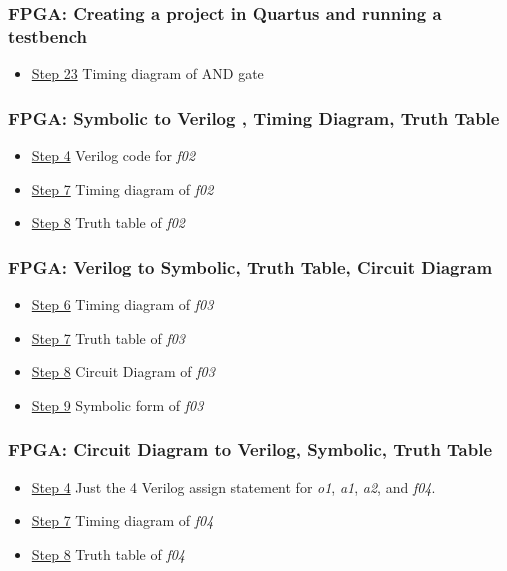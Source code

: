 \subsubsection{FPGA: Creating a project in Quartus and running a testbench}
\begin{itemize}
	\item \protect\hyperlink{Part_1_Step_23}{Step 23} Timing diagram of AND gate
\end{itemize}

\subsubsection{FPGA: Symbolic to Verilog , Timing Diagram, Truth Table}
\begin{itemize}
	\item \protect\hyperlink{Part_2_Step_4}{Step 4} Verilog code for \emph{f02}
	\item \protect\hyperlink{Part_2_Step_7}{Step 7} Timing diagram of \emph{f02}
	\item \protect\hyperlink{Part_2_Step_8}{Step 8} Truth table of \emph{f02}
\end{itemize}

\subsubsection{FPGA: Verilog to Symbolic, Truth Table, Circuit Diagram}
\begin{itemize}
	\item \protect\hyperlink{Part_3_Step_6}{Step 6} Timing diagram of \emph{f03}
	\item \protect\hyperlink{Part_3_Step_7}{Step 7} Truth table of \emph{f03}
	\item \protect\hyperlink{Part_3_Step_8}{Step 8} Circuit	Diagram of \emph{f03}
	\item \protect\hyperlink{Part_3_Step_9}{Step 9} Symbolic form of \emph{f03}
\end{itemize}

\subsubsection{FPGA: Circuit Diagram to Verilog, Symbolic, Truth Table}
\begin{itemize}
	\item \protect\hyperlink{Part_4_Step_4}{Step 4} Just the 4 Verilog assign statement 
			for \emph{o1}, \emph{a1}, \emph{a2}, and \emph{f04}.
	\item \protect\hyperlink{Part_4_Step_7}{Step 7} Timing diagram of \emph{f04}
	\item \protect\hyperlink{Part_4_Step_8}{Step 8} Truth table of \emph{f04}
\end{itemize}

